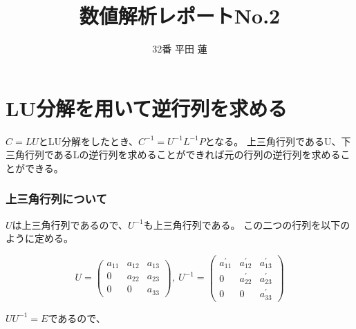 \documentclass{jsarticle}
\title{数値解析レポートNo.2}
\author{32番 平田 蓮}
\date{}
\begin{document}
\maketitle
    \section{LU分解を用いて逆行列を求める}
            $C=LU$とLU分解をしたとき、$C^{-1}=U^{-1}L^{-1}P$となる。
            上三角行列であるU、下三角行列であるLの逆行列を求めることができれば元の行列の逆行列を求めることができる。

            \subsubsection{上三角行列について}
                $U$は上三角行列であるので、$U^{-1}$も上三角行列である。
                この二つの行列を以下のように定める。

                \begin{equation*}
                    U = \left(
                        \begin{array}{ccc}
                            a_{11} & a_{12} & a_{13} \\
                            0 & a_{22} & a_{23} \\
                            0 & 0 & a_{33}
                        \end{array}
                    \right), \
                    U^{-1} = \left(
                        \begin{array}{ccc}
                            a_{11}^{\prime} & a_{12}^{\prime} & a_{13}^{\prime} \\
                            0 & a_{22}^{\prime} & a_{23}^{\prime} \\
                            0 & 0 & a_{33}^{\prime}
                        \end{array}
                    \right)
                \end{equation*}

                $UU^{-1}=E$であるので、
\end{document}
